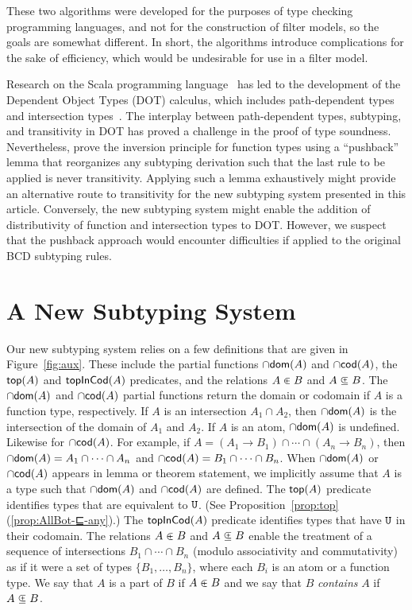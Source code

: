 \documentclass{article}
\begin{document}
These two algorithms were developed for the purposes of type checking
programming languages, and not for the construction of filter models,
so the goals are somewhat different. In short, the algorithms
introduce complications for the sake of efficiency, which would be
undesirable for use in a filter model.

Research on the Scala programming language~\citep{Odersky:2004aa} has
led to the development of the Dependent Object Types (DOT) calculus,
which includes path-dependent types and intersection
types~\citep{Amin:2016aa,Amin:2017aa}.  The interplay between
path-dependent types, subtyping, and transitivity in DOT has proved a
challenge in the proof of type soundness. Nevertheless,
\citet{Rompf:2016aa} prove the inversion principle for function types
using a ``pushback'' lemma that reorganizes any subtyping derivation
such that the last rule to be applied is never transitivity. Applying
such a lemma exhaustively might provide an alternative route to
transitivity for the new subtyping system presented in this
article. Conversely, the new subtyping system might enable the
addition of distributivity of function and intersection types to
DOT. However, we suspect that the pushback approach would encounter
difficulties if applied to the original BCD subtyping rules.


\section{A New Subtyping System}
\label{sec:new-subtyping}

Our new subtyping system relies on a few definitions that are given in
Figure~\ref{fig:aux}. These include the partial functions $\cap\mathsf{dom}(A)$
and $\cap\mathsf{cod}(A)$, the $\mathsf{top}(A)$ and $\mathsf{topInCod}(A)$ predicates, and the
relations $A \inplus B$ and $A \subsetpluseq B$.
%
The $\cap\mathsf{dom}(A)$ and $\cap\mathsf{cod}(A)$ partial functions return the domain or
codomain if $A$ is a function type, respectively. If $A$ is an
intersection $A_1 \cap A_2$, then $\cap\mathsf{dom}(A)$ is the intersection of the
domain of $A_1$ and $A_2$.  If $A$ is an atom, $\cap\mathsf{dom}(A)$ is
undefined. Likewise for $\cap\mathsf{cod}(A)$. For example, if $A = (A_1 \to B_1)
\cap \cdots \cap (A_n \to B_n)$, then $\cap\mathsf{dom}(A) = A_1 \cap \cdots \cap
A_n$ and $\cap\mathsf{cod}(A) = B_1 \cap \cdots \cap B_n$.  When $\cap\mathsf{dom}(A)$ or
$\cap\mathsf{cod}(A)$ appears in lemma or theorem statement, we implicitly assume
that $A$ is a type such that $\cap\mathsf{dom}(A)$ and $\cap\mathsf{cod}(A)$ are defined.
%
The $\mathsf{top}(A)$ predicate identifies types that are equivalent to
$\mathtt{U}$. (See Proposition~\ref{prop:top}(\ref{prop:AllBot-⊑-any}).) The
$\mathsf{topInCod}(A)$ predicate identifies types that have $\mathtt{U}$ in their
codomain.
%
The relations $A \inplus B$ and $A \subsetpluseq B$ enable the
treatment of a sequence of intersections $B_1 \cap \cdots \cap B_n$
(modulo associativity and commutativity) as if it were a set of types
$\{ B_1, \ldots, B_n \}$, where each $B_i$ is an atom or a function
type.  We say that $A$ is a part of $B$ if $A \inplus B$ and we say
that $B$ \emph{contains} $A$ if $A \subsetpluseq B$.
\end{document}
